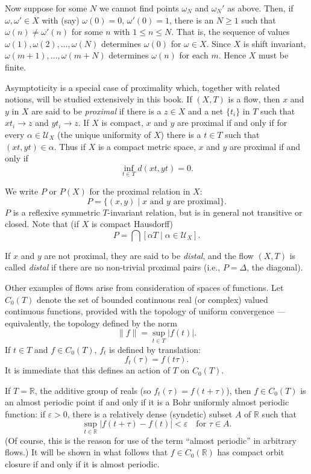 Now suppose for some $N$ we cannot find points $\omega_N$ and $\omega_N'$ as above. Then, if $\omega, \omega' \in X$ with (say) $\omega(0) = 0$, $\omega'(0) = 1$, there is an $N \ge 1$ such that $\omega(n) \ne \omega'(n)$ for some $n$ with $1 \le n \le N$. That is, the sequence of values $\omega(1), \omega(2), \ldots, \omega(N)$ determines $\omega(0)$ for $\omega \in X$. Since $X$ is shift invariant, $\omega(m+1), \ldots, \omega(m+N)$ determines $\omega(n)$ for each $m$. Hence $X$ must be finite.

Asymptoticity is a special case of proximality which, together with related notions, will be studied extensively in this book. If $(X, T)$ is a flow, then $x$ and $y$ in $X$ are said to be \textit{proximal} if there is a $z \in X$ and a net $\{t_i\}$ in $T$ such that $x t_i \to z$ and $y t_i \to z$. If $X$ is compact, $x$ and $y$ are proximal if and only if for every $\alpha \in \mathcal{U}_X$ (the unique uniformity of $X$) there is a $t \in T$ such that $(x t, y t) \in \alpha$. Thus if $X$ is a compact metric space, $x$ and $y$ are proximal if and only if
\[
    \inf_{t \in T} d(x t, y t) = 0.
\]

We write $P$ or $P(X)$ for the proximal relation in $X$:
\[
    P = \{(x, y) \mid x \text{ and } y \text{ are proximal}\}.
\]
$P$ is a reflexive symmetric $T$-invariant relation, but is in general not transitive or closed. Note that (if $X$ is compact Hausdorff)
\[
    P = \bigcap [\alpha T \mid \alpha \in \mathcal{U}_X].
\]

If $x$ and $y$ are not proximal, they are said to be \textit{distal}, and the flow $(X, T)$ is called \textit{distal} if there are no non-trivial proximal pairs (i.e., $P = \Delta$, the diagonal).


Other examples of flows arise from consideration of spaces of functions. Let $C_0(T)$ denote the set of bounded continuous real (or complex) valued continuous functions, provided with the topology of uniform convergence — equivalently, the topology defined by the norm
\[
    \|f\| = \sup_{t \in T} |f(t)|.
\]
If $t \in T$ and $f \in C_0(T)$, $f_t$ is defined by translation:
\[
    f_t(\tau) = f(t\tau).
\]
It is immediate that this defines an action of $T$ on $C_0(T)$.


If $T = \mathbb{R}$, the additive group of reals (so $f_t(\tau) = f(t + \tau)$), then $f \in C_0(T)$ is an almost periodic point if and only if it is a Bohr uniformly almost periodic function: if $\varepsilon > 0$, there is a relatively dense (syndetic) subset $A$ of $\mathbb{R}$ such that
\[
    \sup_{t \in \mathbb{R}} |f(t + \tau) - f(t)| < \varepsilon \quad \text{for } \tau \in A.
\]
(Of course, this is the reason for use of the term “almost periodic” in arbitrary flows.) It will be shown in what follows that $f \in C_0(\mathbb{R})$ has compact orbit closure if and only if it is almost periodic.


